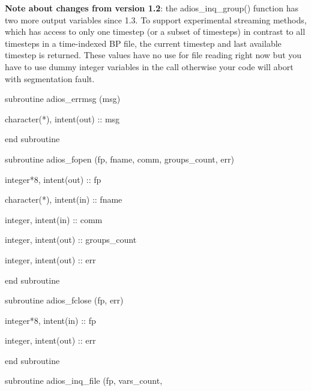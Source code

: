 \vspace{10pt}
\textbf{Note about changes from version 1.2}: the adios\_inq\_group() function 
has two more output variables since 1.3. To support experimental streaming methods, 
which has access to only one timestep (or a subset of timesteps) in contrast to 
all timesteps in a time-indexed BP file, the current timestep and last available 
timestep is returned. These values have no use for file reading right now but you 
have to use dummy integer variables in the call otherwise your code will abort 
with segmentation fault. 

\vspace{10pt}
subroutine adios\_errmsg (msg)

\vspace{10pt}
\parindent=36pt
character(*),   intent(out) :: msg

\vspace{10pt}
\parindent=0pt
end subroutine

\vspace{22pt}
subroutine adios\_fopen (fp, fname, comm, groups\_count, err)

\vspace{10pt}
\parindent=36pt
integer*8,      intent(out) :: fp

\vspace{10pt}
character(*),   intent(in)  :: fname

\vspace{10pt}
integer,        intent(in)  :: comm

\vspace{10pt}
integer,        intent(out) :: groups\_count

\vspace{10pt}
integer,        intent(out) :: err

\vspace{10pt}
\parindent=0pt
end subroutine

\vspace{22pt}
subroutine adios\_fclose (fp, err)

\vspace{10pt}
\parindent=36pt
integer*8,      intent(in)  :: fp

\vspace{10pt}
integer,        intent(out) :: err

\vspace{10pt}
\parindent=0pt
end subroutine

\vspace{22pt}
subroutine adios\_inq\_file (fp, vars\_count, 

